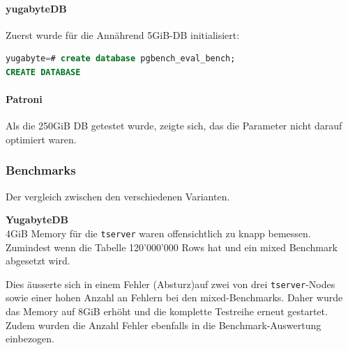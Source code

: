 
\begin{flushleft}
    \paragraph{yugabyteDB}
    Zuerst wurde für die Annährend 5GiB-DB initialisiert:
\lstset{style=gra_codestyle}
\begin{lstlisting}[language=sql, caption=yugabyteDB - Benchmarking - DB erstellen,captionpos=b,label={lst:yugabytedb-benchmarking-create-db},breaklines=true]
yugabyte=# create database pgbench_eval_bench;
CREATE DATABASE
\end{lstlisting}

    \paragraph{Patroni}
    Als die 250GiB DB getestet wurde, zeigte sich, das die Parameter nicht darauf optimiert waren.


    \subsubsection{Benchmarks}
    Der vergleich zwischen den verschiedenen Varianten.\\
\end{flushleft}
\begin{flushleft}
    \begin{warning}
        \textbf{YugabyteDB}\\
        4GiB Memory für die \texttt{tserver} waren offensichtlich zu knapp bemessen.
        Zumindest wenn die Tabelle 120'000'000 Rows hat und ein mixed Benchmark abgesetzt wird.

        Dies äusserte sich in einem Fehler (Absturz)auf zwei von drei \texttt{tserver}-Nodes sowie einer hohen Anzahl an Fehlern bei den mixed-Benchmarks.
        Daher wurde das Memory auf 8GiB erhöht und die komplette Testreihe erneut gestartet.
        Zudem wurden die Anzahl Fehler ebenfalls in die Benchmark-Auswertung einbezogen.
    \end{warning}
\end{flushleft}
